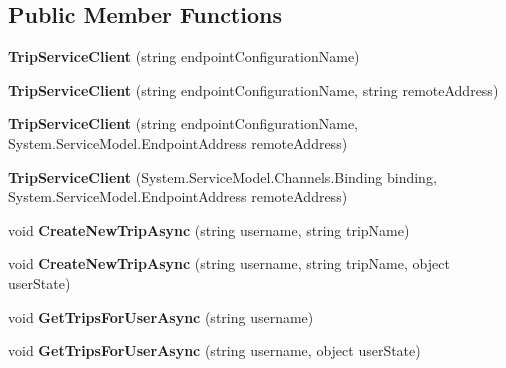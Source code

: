 \subsection*{Public Member Functions}
\begin{DoxyCompactItemize}
\item 
\hypertarget{class_trip_service_client_a00bff7b4e57709fa66367f838cc62003}{
{\bfseries TripServiceClient} (string endpointConfigurationName)}
\label{class_trip_service_client_a00bff7b4e57709fa66367f838cc62003}

\item 
\hypertarget{class_trip_service_client_ab4a2663da378c9b53d77ae14cb527579}{
{\bfseries TripServiceClient} (string endpointConfigurationName, string remoteAddress)}
\label{class_trip_service_client_ab4a2663da378c9b53d77ae14cb527579}

\item 
\hypertarget{class_trip_service_client_a14810eca7652c4f20b773d6f6ee80b4b}{
{\bfseries TripServiceClient} (string endpointConfigurationName, System.ServiceModel.EndpointAddress remoteAddress)}
\label{class_trip_service_client_a14810eca7652c4f20b773d6f6ee80b4b}

\item 
\hypertarget{class_trip_service_client_a74f3aec249adc60fef595b722d37599c}{
{\bfseries TripServiceClient} (System.ServiceModel.Channels.Binding binding, System.ServiceModel.EndpointAddress remoteAddress)}
\label{class_trip_service_client_a74f3aec249adc60fef595b722d37599c}

\item 
\hypertarget{class_trip_service_client_a18cd3772ac45b1a41badea694f81c090}{
void {\bfseries CreateNewTripAsync} (string username, string tripName)}
\label{class_trip_service_client_a18cd3772ac45b1a41badea694f81c090}

\item 
\hypertarget{class_trip_service_client_a9695ce0f452ce4efb9e811b12cd10e57}{
void {\bfseries CreateNewTripAsync} (string username, string tripName, object userState)}
\label{class_trip_service_client_a9695ce0f452ce4efb9e811b12cd10e57}

\item 
\hypertarget{class_trip_service_client_abf37a65ba72504c498cb9dce2f0f91c7}{
void {\bfseries GetTripsForUserAsync} (string username)}
\label{class_trip_service_client_abf37a65ba72504c498cb9dce2f0f91c7}

\item 
\hypertarget{class_trip_service_client_abdaa0d093a9662740585b7e61db6633a}{
void {\bfseries GetTripsForUserAsync} (string username, object userState)}
\label{class_trip_service_client_abdaa0d093a9662740585b7e61db6633a}


\end{DoxyCompactItemize}
